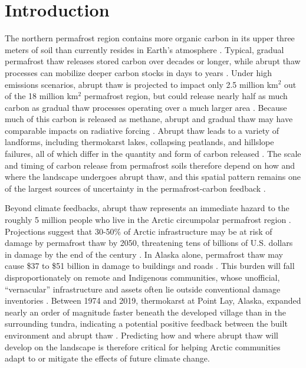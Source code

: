 \documentclass[../main.tex]{subfiles}
\begin{document}
\section{Introduction}

The northern permafrost region contains more organic carbon in its upper three meters of soil than currently resides in Earth's atmosphere \citep{hugelius2014estimated}. Typical, gradual permafrost thaw releases stored carbon over decades or longer, while abrupt thaw processes can mobilize deeper carbon stocks in days to years \citep{turetsky2020carbon, nitzbon2020fast}. Under high emissions scenarios, abrupt thaw is projected to impact only 2.5 million km$^2$ out of the 18 million km$^2$ permafrost region, but could release nearly half as much carbon as gradual thaw processes operating over a much larger area \citep{turetsky2020carbon}. Because much of this carbon is released as methane, abrupt and gradual thaw may have comparable impacts on radiative forcing \citep{turetsky2020carbon}. Abrupt thaw leads to a variety of landforms, including thermokarst lakes, collapsing peatlands, and hillslope failures, all of which differ in the quantity and form of carbon released \citep{olefeldt2016circumpolar, schadel2016potential}. The scale and timing of carbon release from permafrost soils therefore depend on how and where the landscape undergoes abrupt thaw, and this spatial pattern remains one of the largest sources of uncertainty in the permafrost-carbon feedback \citep{walter201821st, turetsky2020carbon}.

Beyond climate feedbacks, abrupt thaw represents an immediate hazard to the roughly 5 million people who live in the Arctic circumpolar permafrost region \citep{ramage2021population}. Projections suggest that 30-50\% of Arctic infrastructure may be at risk of damage by permafrost thaw by 2050, threatening tens of billions of U.S. dollars in damage by the end of the century \citep{hjort2022impacts}. In Alaska alone, permafrost thaw may cause \$37 to \$51 billion in damage to buildings and roads \citep{manos2025permafrost}. This burden will fall disproportionately on remote and Indigenous communities, whose unofficial, ``vernacular'' infrastructure and assets often lie outside conventional damage inventories \citep{verstraete2025vernacular}. Between 1974 and 2019, thermokarst at Point Lay, Alaska, expanded nearly an order of magnitude faster beneath the developed village than in the surrounding tundra, indicating a potential positive feedback between the built environment and abrupt thaw \citep{jones2025climate}. Predicting how and where abrupt thaw will develop on the landscape is therefore critical for helping Arctic communities adapt to or mitigate the effects of future climate change.
\end{document}
